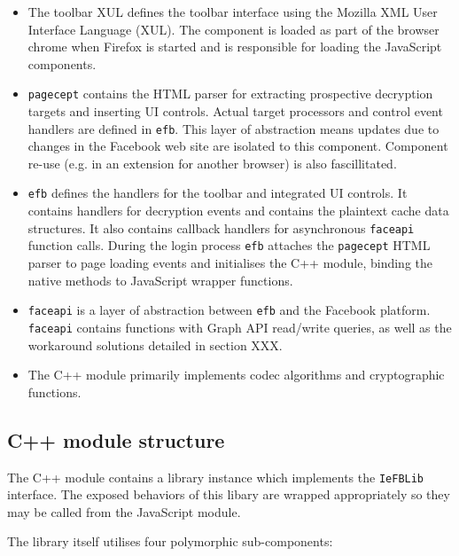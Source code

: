     \begin{itemize}
     
    \item The toolbar XUL defines the toolbar interface using the Mozilla XML User Interface Language (XUL). The component is loaded as part of the browser chrome when Firefox is started and is responsible for loading the JavaScript components.
    
    \item {\tt pagecept} contains the HTML parser for extracting prospective decryption targets and inserting UI controls. Actual target processors and control event handlers are defined in {\tt efb}. This layer of abstraction means updates due to changes in the Facebook web site are isolated to this component. Component re-use (e.g. in an extension for another browser) is also fascillitated. 

    \item {\tt efb} defines the handlers for the toolbar and integrated UI controls. It contains handlers for decryption events and contains the plaintext cache data structures. It also contains callback handlers for asynchronous {\tt faceapi} function calls. During the login process {\tt efb} attaches the {\tt pagecept} HTML parser to page loading events and initialises the C++ module, binding the native methods to JavaScript wrapper functions.
    
    \item {\tt faceapi} is a layer of abstraction between {\tt efb} and the Facebook platform. {\tt faceapi} contains functions with Graph API read/write queries, as well as the workaround solutions detailed in section XXX.

    \item The C++ module primarily implements codec algorithms and cryptographic functions.
    
    \end{itemize}
    


\subsection{C++ module structure}

    The C++ module contains a library instance which implements the {\tt IeFBLib} interface. The exposed behaviors of this libary are wrapped appropriately so they may be called from the JavaScript module.
    
    The library itself utilises four polymorphic sub-components:
    
